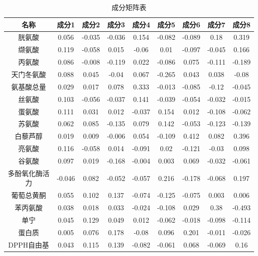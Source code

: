 \documentclass[UTF8]{ctexart}
\begin{document}
\begin{table}[!ht]
	\centering
	\caption{成分矩阵表}
	\begin{tabular}{|c|c|c|c|c|c|c|c|c|}
		\hline
		名称           & 成分1  & 成分2  & 成分3  & 成分4  & 成分5  & 成分6  & 成分7  & 成分8  \\ \hline
		胱氨酸         & 0.056  & -0.035 & -0.036 & 0.154  & -0.082 & -0.089 & 0.18   & 0.319  \\ \hline
		缬氨酸         & 0.119  & -0.058 & 0.015  & -0.06  & 0.01   & -0.097 & -0.045 & 0.166  \\ \hline
		丙氨酸         & 0.086  & -0.008 & -0.119 & 0.022  & -0.086 & 0.075  & -0.111 & -0.189 \\ \hline
		天门冬氨酸     & 0.088  & 0.045  & -0.04  & 0.067  & -0.265 & 0.043  & 0.038  & -0.08  \\ \hline
		氨基酸总量     & 0.029  & 0.017  & 0.078  & 0.333  & -0.013 & -0.085 & -0.12  & -0.045 \\ \hline
		丝氨酸         & 0.103  & -0.056 & -0.037 & 0.141  & -0.039 & -0.054 & -0.032 & -0.015 \\ \hline
		蛋氨酸         & 0.111  & 0.031  & 0.012  & -0.037 & 0.154  & 0.012  & -0.108 & -0.062 \\ \hline
		苏氨酸         & 0.062  & 0.085  & -0.135 & 0.079  & 0.142  & -0.053 & -0.123 & -0.139 \\ \hline
		白藜芦醇       & 0.019  & 0.009  & -0.006 & 0.054  & -0.109 & 0.412  & 0.082  & 0.396  \\ \hline
		亮氨酸         & 0.116  & -0.058 & 0.014  & -0.091 & 0.02   & -0.121 & -0.03  & 0.098  \\ \hline
		谷氨酸         & 0.097  & 0.019  & -0.168 & -0.004 & 0.003  & 0.069  & -0.032 & -0.061 \\ \hline
		多酚氧化酶活力 & -0.046 & 0.082  & -0.052 & -0.057 & 0.216  & -0.178 & -0.068 & 0.197  \\ \hline
		葡萄总黄酮     & 0.055  & 0.102  & 0.137  & -0.074 & -0.125 & -0.075 & 0.003  & 0.006  \\ \hline
		苯丙氨酸       & 0.038  & 0.018  & 0.033  & -0.024 & -0.108 & 0.029  & 0.38   & -0.493 \\ \hline
		单宁           & 0.045  & 0.129  & 0.049  & 0.012  & -0.062 & -0.018 & -0.098 & -0.114 \\ \hline
		蛋白质         & 0.005  & 0.076  & 0.178  & -0.08  & 0.096  & 0.201  & -0.011 & -0.026 \\ \hline
		DPPH自由基     & 0.043  & 0.115  & 0.139  & -0.082 & -0.061 & 0.068  & -0.069 & 0.16   \\ \hline

\end{tabular}
\end{table}
\end{document}
